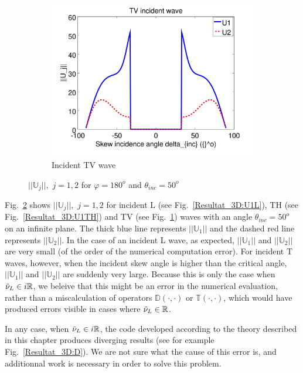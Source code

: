 \begin{figure}
\begin{subfigure}[b]{0.32\textwidth}
        \includegraphics[width=\textwidth]{images/chapter4/Resultats_3D/U1TV_180_50.png}
        \caption{Incident TV wave}
        \label{Resultat_3D:U1TV}
    \end{subfigure} 
\caption{$||\mathbb{U}_j||, \, \, j=1,2$ for $\varphi=180^o$ and $\theta_{inc}=50^o$}
\label{Resultat_3D:U1}
\end{figure}

Fig.~\ref{Resultat_3D:U1} shows $||\mathbb{U}_j||, \, \, j=1,2$ for incident L (see Fig.~\ref{Resultat_3D:U1L}), TH (see Fig.~\ref{Resultat_3D:U1TH}) and TV (see Fig.~\ref{Resultat_3D:U1TV}) waves with an angle $\theta_{inc}=50^o$ on an infinite plane. The thick blue line represents $||\mathbb{U}_1||$ and the dashed red line represents $||\mathbb{U}_2||$. In the case of an incident L wave, as expected, $||\mathbb{U}_1||$ and $||\mathbb{U}_2||$ are very small (of the order of the numerical computation error). For incident T waves, however, when the incident skew angle is higher than the critical angle, $||\mathbb{U}_1||$ and $||\mathbb{U}_2||$ are suddenly very large. Because this is only the case when $\tilde{\nu}_L \in i\mathbb{R}$, we beleive that this might be an error in the numerical evaluation, rather than a miscalculation of operators $\mathbb{D}(\cdot,\cdot)$ or $\mathbb{T}(\cdot,\cdot)$, which would have produced errors visible in cases where $\tilde{\nu}_L \in \mathbb{R}$. 

In any case, when $\tilde{\nu}_L \in i\mathbb{R}$, the code developed according to the theory described in this chapter produces diverging results (see for example Fig.~\ref{Resultat_3D:D}). We are not sure what the cause of this error is, and additionnal work is necessary in order to solve this problem.

